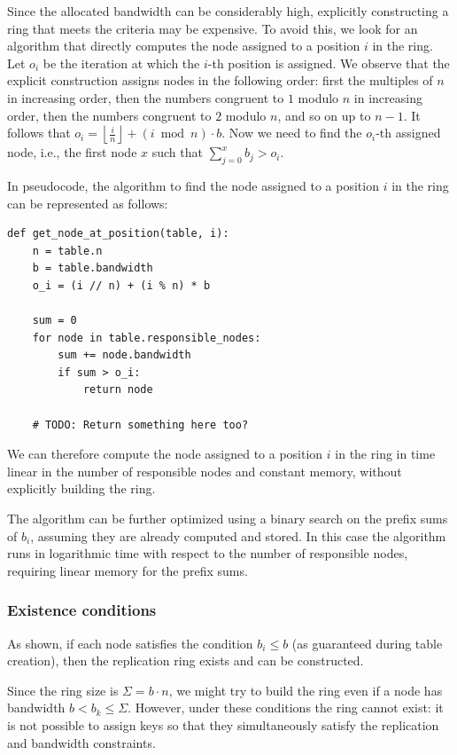 Since the allocated bandwidth can be considerably high, explicitly constructing a ring that meets the criteria may be expensive.
To avoid this, we look for an algorithm that directly computes the node assigned to a position $i$ in the ring.
Let $o_i$ be the iteration at which the $i$-th position is assigned.
We observe that the explicit construction assigns nodes in the following order: first the multiples of $n$ in increasing order, then the numbers congruent to $1$ modulo $n$ in increasing order, then the numbers congruent to $2$ modulo $n$, and so on up to $n-1$.
It follows that $\displaystyle o_i = \left\lfloor \frac{i}{n} \right\rfloor + (i \bmod n) \cdot b$.
Now we need to find the $o_i$-th assigned node, i.e., the first node $x$ such that $\displaystyle \sum_{j=0}^{x} b_j > o_i$.

In pseudocode, the algorithm to find the node assigned to a position $i$ in the ring can be represented as follows:
\begin{verbatim}
def get_node_at_position(table, i):
    n = table.n
    b = table.bandwidth
    o_i = (i // n) + (i % n) * b

    sum = 0
    for node in table.responsible_nodes:
        sum += node.bandwidth
        if sum > o_i:
            return node

    # TODO: Return something here too?
\end{verbatim}

We can therefore compute the node assigned to a position $i$ in the ring in time linear in the number of responsible nodes and constant memory, without explicitly building the ring.

The algorithm can be further optimized using a binary search on the prefix sums of $b_i$, assuming they are already computed and stored.
In this case the algorithm runs in logarithmic time with respect to the number of responsible nodes, requiring linear memory for the prefix sums.

\subsubsection{Existence conditions}
\label{subsubsec:existence-conditions}

As shown, if each node satisfies the condition $b_i \leq b$ (as guaranteed during table creation), then the replication ring exists and can be constructed.

Since the ring size is $\Sigma = b \cdot n$, we might try to build the ring even if a node has bandwidth $b < b_k \leq \Sigma$.
However, under these conditions the ring cannot exist: it is not possible to assign keys so that they simultaneously satisfy the replication and bandwidth constraints.

